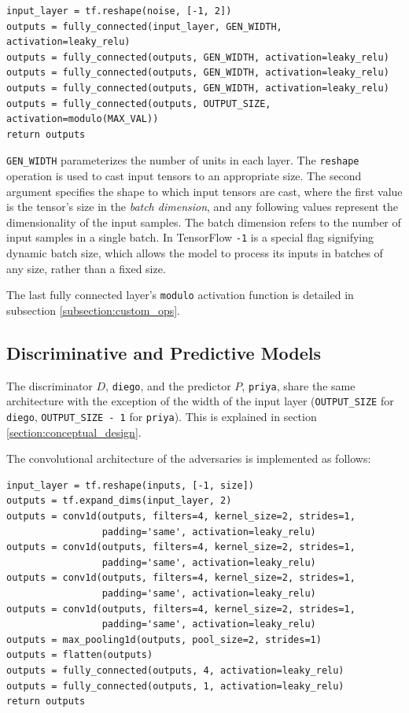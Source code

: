 \documentclass[12pt, titlepage]{report}
\theoremstyle{definition}
\begin{document}
\begin{verbatim}
input_layer = tf.reshape(noise, [-1, 2])
outputs = fully_connected(input_layer, GEN_WIDTH, activation=leaky_relu)
outputs = fully_connected(outputs, GEN_WIDTH, activation=leaky_relu)
outputs = fully_connected(outputs, GEN_WIDTH, activation=leaky_relu)
outputs = fully_connected(outputs, GEN_WIDTH, activation=leaky_relu)
outputs = fully_connected(outputs, OUTPUT_SIZE, activation=modulo(MAX_VAL))
return outputs
\end{verbatim} 

\texttt{GEN_WIDTH} parameterizes the number of units in each layer. The \texttt{reshape} operation is used to cast input tensors to an appropriate size. The second argument specifies the shape to which input tensors are cast, where the first value is the tensor's size in the \textit{batch dimension}, and any following values represent the dimensionality of the input samples. The batch dimension refers to the number of input samples in a single batch. In TensorFlow \texttt{-1} is a special flag signifying dynamic batch size, which allows the model to process its inputs in batches of any size, rather than a fixed size.

The last fully connected layer's \texttt{modulo} activation function is detailed in subsection \ref{subsection:custom_ops}.


\subsection{Discriminative and Predictive Models}
The discriminator $D$, \texttt{diego}, and the predictor $P$, \texttt{priya}, share the same architecture with the exception of the width of the input layer (\texttt{OUTPUT_SIZE} for \texttt{diego}, \texttt{OUTPUT_SIZE - 1} for \texttt{priya}). This is explained in section \ref{section:conceptual_design}.

The convolutional architecture of the adversaries is implemented as follows:

\begin{verbatim}
input_layer = tf.reshape(inputs, [-1, size])
outputs = tf.expand_dims(input_layer, 2)
outputs = conv1d(outputs, filters=4, kernel_size=2, strides=1, 
                 padding='same', activation=leaky_relu)
outputs = conv1d(outputs, filters=4, kernel_size=2, strides=1, 
                 padding='same', activation=leaky_relu)
outputs = conv1d(outputs, filters=4, kernel_size=2, strides=1, 
                 padding='same', activation=leaky_relu)
outputs = conv1d(outputs, filters=4, kernel_size=2, strides=1, 
                 padding='same', activation=leaky_relu)
outputs = max_pooling1d(outputs, pool_size=2, strides=1)
outputs = flatten(outputs)
outputs = fully_connected(outputs, 4, activation=leaky_relu)
outputs = fully_connected(outputs, 1, activation=leaky_relu)
return outputs
\end{verbatim}
\end{document}
